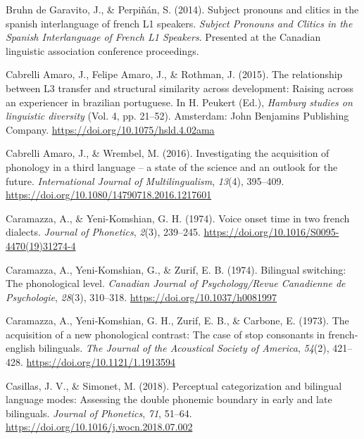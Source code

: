 \documentclass[
  man]{apa6}
\newlength{\cslhangindent}
\newlength{\cslentryspacingunit} %
\newenvironment{CSLReferences}[2] %
 {%
  \setlength{\parindent}{0pt}
  \ifodd #1
  \let\oldpar\par
  \def\par{\hangindent=\cslhangindent\oldpar}
  \fi
  \setlength{\parskip}{#2\cslentryspacingunit}
 }%
 {}
\begin{document}
\begin{CSLReferences}{1}{0}
\leavevmode{}%
Bruhn de Garavito, J., \& Perpiñán, S. (2014). Subject pronouns and clitics in the spanish interlanguage of french L1 speakers. \emph{Subject Pronouns and Clitics in the Spanish Interlanguage of French L1 Speakers}. Presented at the Canadian linguistic association conference proceedings.

\leavevmode{}%
Cabrelli Amaro, J., Felipe Amaro, J., \& Rothman, J. (2015). The relationship between L3 transfer and structural similarity across development: Raising across an experiencer in brazilian portuguese. In H. Peukert (Ed.), \emph{Hamburg studies on linguistic diversity} (Vol. 4, pp. 21--52). Amsterdam: John Benjamins Publishing Company. \url{https://doi.org/10.1075/hsld.4.02ama}

\leavevmode{}%
Cabrelli Amaro, J., \& Wrembel, M. (2016). Investigating the acquisition of phonology in a third language -- a state of the science and an outlook for the future. \emph{International Journal of Multilingualism}, \emph{13}(4), 395--409. \url{https://doi.org/10.1080/14790718.2016.1217601}

\leavevmode{}%
Caramazza, A., \& Yeni-Komshian, G. H. (1974). Voice onset time in two french dialects. \emph{Journal of Phonetics}, \emph{2}(3), 239--245. \url{https://doi.org/10.1016/S0095-4470(19)31274-4}

\leavevmode{}%
Caramazza, A., Yeni-Komshian, G., \& Zurif, E. B. (1974). Bilingual switching: The phonological level. \emph{Canadian Journal of Psychology/Revue Canadienne de Psychologie}, \emph{28}(3), 310--318. \url{https://doi.org/10.1037/h0081997}

\leavevmode{}%
Caramazza, A., Yeni‐Komshian, G. H., Zurif, E. B., \& Carbone, E. (1973). The acquisition of a new phonological contrast: The case of stop consonants in french‐english bilinguals. \emph{The Journal of the Acoustical Society of America}, \emph{54}(2), 421--428. \url{https://doi.org/10.1121/1.1913594}

\leavevmode{}%
Casillas, J. V., \& Simonet, M. (2018). Perceptual categorization and bilingual language modes: Assessing the double phonemic boundary in early and late bilinguals. \emph{Journal of Phonetics}, \emph{71}, 51--64. \url{https://doi.org/10.1016/j.wocn.2018.07.002}


\end{CSLReferences}
\end{document}
